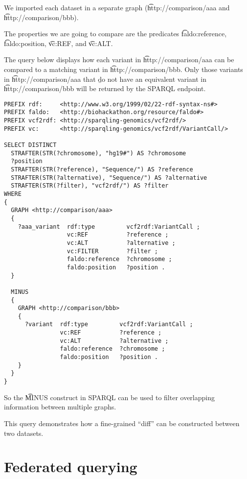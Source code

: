   We imported each dataset in a separate graph (\t{http://comparison/aaa}
  and \t{http://comparison/bbb}).

  The properties we are going to compare are the predicates \t{faldo:reference},
  \t{faldo:position}, \t{vc:REF}, and \t{vc:ALT}.

  The query below displays how each variant in \t{http://comparison/aaa}
  can be compared to a matching variant in \t{http://comparison/bbb}.
  Only those variants in \t{http://comparison/aaa} that \b{do not}
  have an equivalent variant in \t{http://comparison/bbb} will be
  returned by the SPARQL endpoint.

\begin{siderules}
\begin{verbatim}
PREFIX rdf:     <http://www.w3.org/1999/02/22-rdf-syntax-ns#>
PREFIX faldo:   <http://biohackathon.org/resource/faldo#>
PREFIX vcf2rdf: <http://sparqling-genomics/vcf2rdf/>
PREFIX vc:      <http://sparqling-genomics/vcf2rdf/VariantCall/>

SELECT DISTINCT
  STRAFTER(STR(?chromosome), "hg19#") AS ?chromosome
  ?position
  STRAFTER(STR(?reference), "Sequence/") AS ?reference
  STRAFTER(STR(?alternative), "Sequence/") AS ?alternative
  STRAFTER(STR(?filter), "vcf2rdf/") AS ?filter
WHERE
{
  GRAPH <http://comparison/aaa>
  {
    ?aaa_variant  rdf:type         vcf2rdf:VariantCall ;
                  vc:REF           ?reference ;
                  vc:ALT           ?alternative ;
                  vc:FILTER        ?filter ;
                  faldo:reference  ?chromosome ;
                  faldo:position   ?position .
  }

  MINUS
  {
    GRAPH <http://comparison/bbb>
    {
      ?variant  rdf:type         vcf2rdf:VariantCall ;
                vc:REF           ?reference ;
                vc:ALT           ?alternative ;
                faldo:reference  ?chromosome ;
                faldo:position   ?position .
    }
  }
}
\end{verbatim}
\end{siderules}

  So the \t{MINUS} construct in SPARQL can be used to filter overlapping
  information between multiple graphs.

  This query demonstrates how a fine-grained ``diff'' can be constructed
  between two datasets.

\section{Federated querying}
\label{sec:federated-querying}

